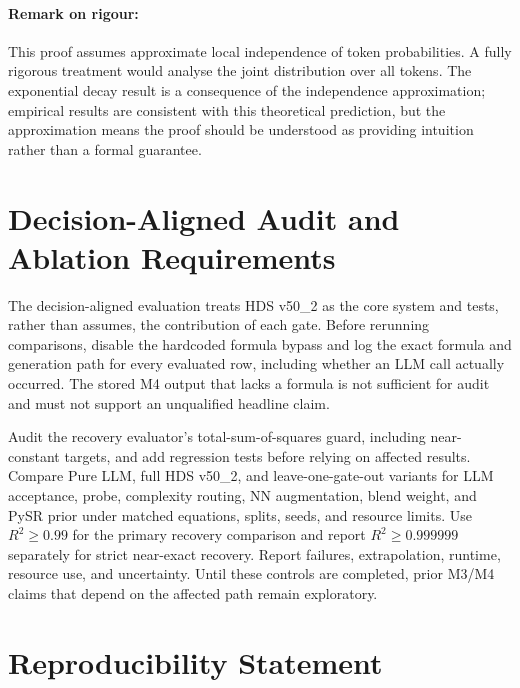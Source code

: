 \documentclass[twoside,11pt]{article}
\begin{document}
\paragraph{Remark on rigour:} This proof assumes approximate local independence of token probabilities. A fully rigorous treatment would analyse the joint distribution over all tokens. The exponential decay result is a consequence of the independence approximation; empirical results are consistent with this theoretical prediction, but the approximation means the proof should be understood as providing intuition rather than a formal guarantee\citep{kambhampati2024llms}.



\section{Decision-Aligned Audit and Ablation Requirements}
\label{sec:decision-aligned-audit}

The decision-aligned evaluation treats HDS v50\_2 as the core system and
tests, rather than assumes, the contribution of each gate. Before rerunning
comparisons, disable the hardcoded formula bypass and log the exact formula
and generation path for every evaluated row, including whether an LLM call
actually occurred. The stored M4 output that lacks a formula is not sufficient
for audit and must not support an unqualified headline claim.

Audit the recovery evaluator's total-sum-of-squares guard, including
near-constant targets, and add regression tests before relying on affected
results. Compare Pure LLM, full HDS v50\_2, and leave-one-gate-out variants
for LLM acceptance, probe, complexity routing, NN augmentation, blend weight,
and PySR prior under matched equations, splits, seeds, and resource limits.
Use $R^2 \geq 0.99$ for the primary recovery comparison and report
$R^2 \geq 0.999999$ separately for strict near-exact recovery. Report failures,
extrapolation, runtime, resource use, and uncertainty. Until these controls
are completed, prior M3/M4 claims that depend on the affected path remain
exploratory.

\section{Reproducibility Statement}
\label{app:reproducibility}
\end{document}
